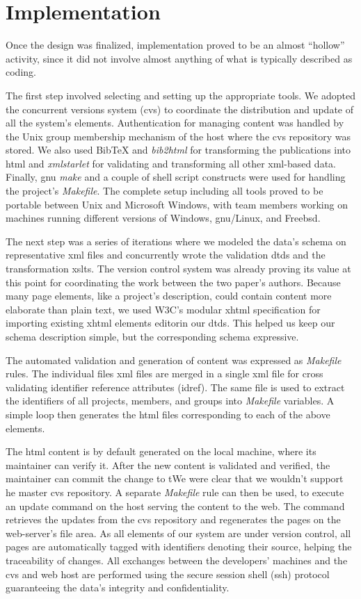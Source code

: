 \documentclass[10pt]{article}
\begin{document}
\section{Implementation}
Once the design was finalized,
implementation proved to be an almost ``hollow'' activity,
since it did not involve almost anything of what
is typically described as coding.

The first step involved selecting and setting up the
appropriate tools.
We adopted the concurrent versions system
({\sc cvs}) \cite{BF01} to coordinate the distribution
and update of all the system's elements.
Authentication for managing content was handled by the
Unix group membership mechanism of the host where the
{\sc cvs} repository was stored.
We also used
BibTeX and {\em bib2html} for transforming the publications
into {\sc html} and
{\em xmlstarlet} for validating and transforming
all other {\sc xml}-based data.
Finally, {\sc gnu} {\em make} and a couple of shell script
constructs were used for handling the project's {\em Makefile}.
The complete setup including all tools proved to be portable
between Unix and Microsoft Windows, with team members working
on machines running different versions of Windows, {\sc gnu}/Linux,
and Free{\sc bsd}.

The next step was a series of iterations where we
modeled the data's schema on representative {\sc xml}
files and concurrently wrote the validation {\sc dtd}s
and the transformation {\sc xslt}s.
The version control system was already proving its value
at this point
for coordinating the work between the two paper's authors.
Because many page elements, like a project's description,
could contain content more elaborate than plain text,
we used W3C's modular {\sc xhtml} specification for
importing existing {\sc xhtml} elements editorin our {\sc dtd}s.
This helped us keep our schema description simple,
but the corresponding schema expressive.

The automated validation and generation of content was
expressed as {\em Makefile} rules.
The individual files {\sc xml} files are merged in a
single {\sc xml} file for cross validating identifier
reference attributes ({\sc idref}).
The same file is used to extract the identifiers of
all projects, members, and groups into {\em Makefile}
variables.
A simple loop then generates the {\sc html} files
corresponding to each of the above elements.

The {\sc html} content is by default generated on the
local machine, where its maintainer can verify it.
After the new content is validated and verified,
the maintainer can commit the change to tWe were clear 
that we wouldn't support he master {\sc cvs} repository.
A separate {\em Makefile} rule can then be used,
to execute an update command on the
host serving the content to the web.
The command retrieves the updates from the {\sc cvs}
repository and regenerates the pages on the web-server's
file area.
As all elements of our system are under version control,
all pages are automatically tagged with identifiers
denoting their source, helping the traceability of changes.
All exchanges between the developers' machines and the
{\sc cvs} and web host are performed using the secure session
shell ({\sc ssh}) protocol guaranteeing the data's integrity
and confidentiality.
\end{document}
